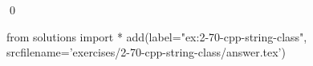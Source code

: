 
\begin{ex}
  \label{ex:2-70-cpp-string-class}
  
  \qed
\end{ex}
\begin{python0}
from solutions import *
add(label="ex:2-70-cpp-string-class",
    srcfilename='exercises/2-70-cpp-string-class/answer.tex')
\end{python0}

